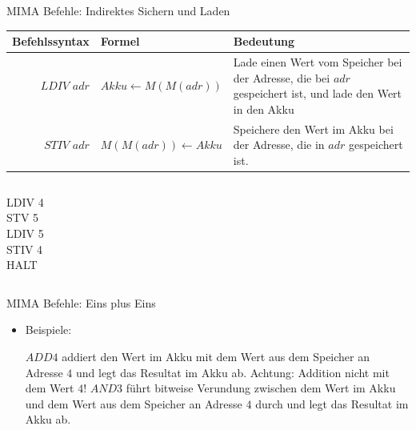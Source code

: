 \begin{frame}{MIMA Befehle: Indirektes Sichern und Laden}
	\begin{tabular}{r | l p{5cm} }
		Befehlssyntax & Formel & Bedeutung\\\hline\hline 
		$LDIV$ $adr$ & $Akku \leftarrow M(M(adr))$ & Lade einen Wert vom Speicher bei der Adresse, die bei $adr$ gespeichert ist, und lade den Wert in den Akku\\\hline
		$STIV$ $adr$ & $M(M(adr)) \leftarrow Akku$ & Speichere den Wert im Akku bei der Adresse, die in $adr$ gespeichert ist.
	\end{tabular}
	
	\bp 
	\vspace{.5cm}
	\vspace{.2cm}
	
	\begin{columns}
		\begin{column}{0.5\textwidth}
			LDIV 4 \\ STV 5 \\ LDIV 5 \\ STIV 4 \\ HALT
		\end{column}
		
		\begin{column}{0.5\textwidth}
			\begin{memory}
			\end{memory}
		\end{column}
	\end{columns}
\end{frame}

\begin{frame}{MIMA Befehle: Eins plus Eins}
	\begin{itemize}
		\pitem Befehle zu arithmetischen Operationen
		\pitem Eine ALU-Operation, angewandt auf dem Wert des Akkus und dem Wert an gegebener Adresse
		
		\bp
		
		\item Beispiele:
		\begin{itemize}
			\pitem $ADD 4$ addiert den Wert im Akku mit dem Wert aus dem Speicher an Adresse $4$ und legt das Resultat im Akku ab\ip . Achtung: Addition nicht mit dem Wert $4$!
			\pitem $AND 3$ führt bitweise Verundung zwischen dem Wert im Akku und dem Wert aus dem Speicher an Adresse $4$ durch und legt das Resultat im Akku ab.
		\end{itemize}
	\end{itemize}
\end{frame}


